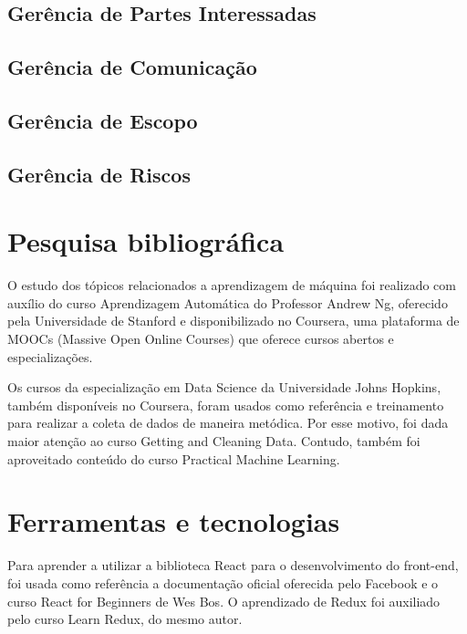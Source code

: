 \subsection{Gerência de Partes Interessadas}
\subsection{Gerência de Comunicação}
\subsection{Gerência de Escopo}
\subsection{Gerência de Riscos}

\section{Pesquisa bibliográfica}
O estudo dos tópicos relacionados a aprendizagem de máquina foi realizado com auxílio do curso Aprendizagem Automática do Professor Andrew Ng, oferecido pela Universidade de Stanford e disponibilizado no Coursera, uma plataforma de MOOCs (Massive Open Online Courses) que oferece cursos abertos e especializações.

Os cursos da especialização em Data Science da Universidade Johns Hopkins, também disponíveis no Coursera, foram usados como referência e treinamento para realizar a coleta de dados de maneira metódica. Por esse motivo, foi dada maior atenção ao curso Getting and Cleaning Data. Contudo, também foi aproveitado conteúdo do curso Practical Machine Learning.

\section{Ferramentas e tecnologias}
Para aprender a utilizar a biblioteca React para o desenvolvimento do front-end, foi usada como referência a documentação oficial oferecida pelo Facebook e o curso React for Beginners de Wes Bos. O aprendizado de Redux foi auxiliado pelo curso Learn Redux, do mesmo autor.
